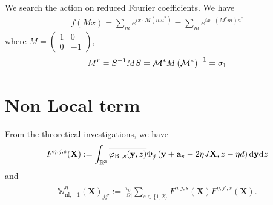 \documentclass[11pt,a4paper,reqno,french,tikz]{amsart}
\def\d{{\rm d}}
\newcommand{\pa}[1]{\left( #1 \right)} %
\newcommand{\ab}[1]{\left|#1\right|} %
\newcommand\vp{\varphi} %
\newcommand{\f}[2]{\frac{#1}{#2}} %
\newcommand{\mat}[1]{\begin{pmatrix} #1 \end{pmatrix}} %
\def\bX{{\mathbf X}}
\def\ba{{\mathbf a}}
\def\by{{\mathbf y}}
\def\bbW{{\mathbb W}}
\begin{document}
We search the action on reduced Fourier coefficients. We have
\begin{align*}
f(M x) = \sum_m e^{i x \cdot M\pa{m a^*}} = \sum_m e^{i x \cdot \pa{M^r m}a^*}
\end{align*}
where $M = \mat{1 & 0 \\ 0 & -1}$,
\begin{align*}
M^r = S^{-1} M S = \cM^* M \pa{\cM^*}^{-1} = \sigma_1
\end{align*}


\section{Non Local term}%
\label{sec:non_local_term}

From the theoretical investigations, we have
\begin{align*}
F^{\eta,j,s}(\bX) := \int_{\R^3} \overline{\vp_{\text{Bl},s}(\by,z)} \Phi_j\pa{\by +\ba_s -2\eta J \bX,z-\eta d} \d \by \d z
\end{align*}
and
\begin{align*}
\bbW_{\text{nl},-1}^\eta\pa{\bX}_{jj'} := \f{v_0}{\ab{\Omega}} \sum_{s \in \{1,2\}} \overline{F^{\eta,j,s}(\bX)} F^{\eta,j',s}(\bX).
\end{align*}
\end{document}
